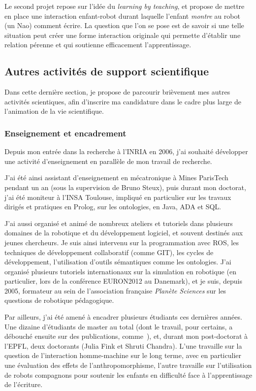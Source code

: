 \documentclass[a4paper]{article}
\begin{document}
Le second projet repose sur l'idée du \emph{learning by teaching}, et propose de
mettre en place une interaction enfant-robot durant laquelle l'enfant
\emph{montre} au robot (un Nao) comment écrire. La question que l'on se pose est
de savoir si une telle situation peut créer une forme interaction originale qui
permette d'établir une relation pérenne et qui soutienne efficacement
l'apprentissage.


\subsection{Autres activités de support scientifique}

Dans cette dernière section, je propose de parcourir brièvement mes autres
activités scientiques, afin d'inscrire ma candidature dans le cadre plus large
de l'animation de la vie scientifique.

\subsubsection{Enseignement et encadrement}

Depuis mon entrée dans la recherche à l'INRIA en 2006, j'ai souhaité développer une
activité d'enseignement en parallèle de mon travail de recherche.

J'ai été ainsi assistant d'enseignement en mécatronique à Mines ParisTech
pendant un an (sous la supervision de Bruno Steux), puis durant mon doctorat,
j'ai été moniteur à l'INSA Toulouse, impliqué en particulier sur les travaux
dirigés et pratiques en Prolog, sur les ontologies, en Java, ADA et SQL.

J'ai aussi organisé et animé de nombreux ateliers et tutoriels dans plusieurs
domaines de la robotique et du développement logiciel, et souvent destinés aux
jeunes chercheurs. Je suis ainsi intervenu sur la programmation avec ROS, les
techniques de développement collaboratif (comme GIT), les cycles de
développement, l'utilisation d'outils sémantiques comme les ontologies. J'ai
organisé plusieurs tutoriels internationaux sur la simulation en robotique (en
particulier, lors de la conférence EURON2012 au Danemark), et je suis, depuis
2005, formateur au sein de l'association française \emph{Planète Sciences} sur
les questions de robotique pédagogique.

Par ailleurs, j'ai été amené à encadrer plusieurs étudiants ces dernières
années. Une dizaine d'étudiants de master au total (dont le travail, pour
certains, a débouché ensuite sur des publications, comme~\cite{Lemaignan2011a}),
et, durant mon post-doctorat à l'EPFL, deux doctorants (Julia Fink et Shruti
Chandra). L'une travaille sur la question de l'interaction homme-machine sur le
long terme, avec en particulier une évaluation des effets de
l'anthropomorphisme, l'autre travaille sur l'utilisation de robots compagnons
pour soutenir les enfants en difficulté face à l'apprentissage de l'écriture.
\end{document}
